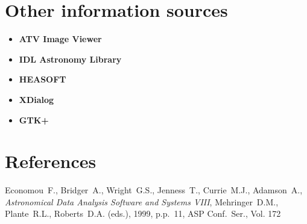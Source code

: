 \documentclass[twoside,11pt]{starlink}
\begin{document}
\section{Other information sources\label{sc16_sources}}

\begin{small}
\begin{itemize}


\item {\bf\label{sc16_sources_atv}ATV Image Viewer}\\

\item {\bf\label{sc16_sources_fitsidl}IDL Astronomy Library}\\

\item {\bf\label{sc16_sources_heasoft}HEASOFT}\\

\item {\bf\label{sc16_sources_xdialog}XDialog}\\

\item {\bf\label{sc16_sources_gtk}GTK+}\\

\end{itemize}
\end{small}

\section*{References\label{sc16_refs}}

\begin{refs}
\item Economou~F., Bridger~A., Wright~G.S., Jenness~T., Currie~M.J., Adamson~A., \emph{Astronomical Data Analysis Software and Systems VIII}, Mehringer~D.M., Plante~R.L., Roberts~D.A. (eds.), 1999, p.p.\ 11, ASP Conf.\ Ser., Vol. 172
\end{refs}
\end{document}
